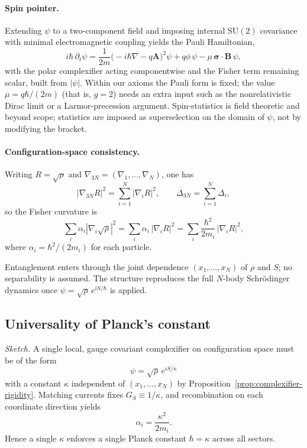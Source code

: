 \documentclass[11pt,a4paper]{article}
\numberwithin{equation}{section}
\theoremstyle{thmcompact}
\theoremstyle{remark}
\begin{document}
\paragraph{Spin pointer.}
Extending $\psi$ to a two-component field and imposing internal $\mathrm{SU}(2)$ covariance with minimal electromagnetic coupling yields the Pauli Hamiltonian,
\[
i\hbar\,\partial_t\psi=\frac{1}{2m}\bigl(-i\hbar\nabla-q\mathbf A\bigr)^2\psi+q\phi\,\psi-\mu\,\boldsymbol{\sigma}\!\cdot\!\mathbf B\,\psi,
\]
with the polar complexifier acting componentwise and the Fisher term remaining scalar, built from $|\psi|$. Within our axioms the Pauli form is fixed; the value $\mu=q\hbar/(2m)$ (that is, $g=2$) needs an extra input such as the nonrelativistic Dirac limit or a Larmor-precession argument. Spin-statistics is field theoretic and beyond scope; statistics are imposed as superselection on the domain of $\psi$, not by modifying the bracket.

\paragraph{Configuration-space consistency.}
Writing \(R=\sqrt\rho\) and \(\nabla_{3N}=(\nabla_1,\dots,\nabla_N)\), one has
\[
|\nabla_{3N} R|^{2}=\sum_{i=1}^{N}|\nabla_i R|^{2},\qquad
\Delta_{3N}=\sum_{i=1}^{N}\Delta_i,
\]
so the Fisher curvature is
\[
\sum_i \alpha_i|\nabla_i\sqrt\rho|^{2}
=
\sum_i \alpha_i\,|\nabla_i R|^{2}
=
\sum_i \frac{\hbar^{2}}{2m_i}\,|\nabla_i R|^{2},
\]
where $\alpha_i=\hbar^{2}/(2m_i)$ for each particle.

Entanglement enters through the joint dependence \((x_1,\dots,x_N)\) of \(\rho\) and \(S\); no separability is assumed. The structure reproduces the full \(N\)-body Schrödinger dynamics once \(\psi=\sqrt{\rho}\,e^{iS/\hbar}\) is applied.

\subsection*{Universality of Planck's constant}
\label{subsec:hbar-universality}

\textit{Sketch.}
A single local, gauge covariant complexifier on configuration space must be of
the form
\[
\psi=\sqrt\rho\,e^{iS/\kappa}
\]
with a constant \(\kappa\) independent of \((x_1,\dots,x_N)\) by
Proposition~\ref{prop:complexifier-rigidity}. Matching currents fixes
\(G_S\equiv 1/\kappa\), and recombination on each coordinate direction yields
\[
\alpha_i=\frac{\kappa^{2}}{2m_i}.
\]
Hence a single \(\kappa\) enforces a single Planck constant \(\hbar=\kappa\)
across all sectors.
\end{document}
